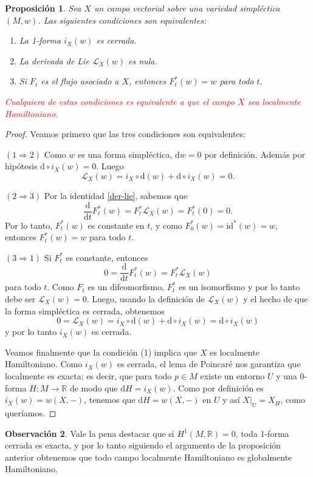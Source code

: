 \documentclass[11pt, a4paper]{article}
\newcommand{\RR}{\mathbb{R}}
\newcommand{\id}{\mathrm{id}}
\newcommand{\LL}{\mathcal{L}}
\newcommand{\dd}{\mathrm{d}}
\newcommand{\ddt}{\frac{\dd}{\dd t}}
\theoremstyle{plain}
\newtheorem{prop}{Proposición}[section]
\theoremstyle{definition}
\newtheorem{obs}[prop]{Observación}
\begin{document}
\begin{prop} Sea $X$ un campo vectorial sobre una variedad simpléctica $(M,w)$. Las siguientes condiciones son equivalentes:
\begin{enumerate}
\item La 1-forma $i_X(w)$ es cerrada.
\item La derivada de Lie $\LL_X(w)$ es nula.
\item Si $F_t$ es el flujo asociado a $X$, entonces $F_t^*(w)=w$ para todo $t$.
\end{enumerate}
\textcolor{red}{Cualquiera de estas condiciones es equivalente a que el campo $X$ sea localmente Hamiltoniano.}
\end{prop}
\begin{proof} Veamos primero que las tres condiciones son equivalentes:

$(1\Rightarrow 2)$ Como $w$ es una forma simpléctica, $\dd w=0$ por definición. Además por hipótesis $\dd \circ i_X(w)=0$. Luego
\[\LL_X(w)=i_X\circ\dd (w)+\dd \circ i_X(w)=0.\]

$(2\Rightarrow 3)$ Por la identidad \eqref{der-lie}, sabemos que
\[\ddt F_t^*(w) = F_t^*\LL_X(w)=F_t^*(0)=0.\]
Por lo tanto, $F_t^*(w)$ es constante en $t$, y como $F_0^*(w)=\id^*(w)=w$, entonces $F_t^*(w)=w$ para todo $t$.

$(3\Rightarrow 1)$ Si $F_t^*$ es constante, entonces
\[0=\ddt F_t^*(w) = F_t^*\LL_X(w)\]
para todo $t$. Como $F_t$ es un difeomorfismo, $F_t^*$ es un isomorfismo y por lo tanto debe ser $\LL_X(w)=0$. Luego, usando la definición de $\LL_X(w)$ y el hecho de que la forma simpléctica es cerrada, obtenemos
\[0=\LL_X(w)=i_X\circ\dd (w)+\dd \circ i_X(w) =\dd \circ i_X(w)\]
y por lo tanto $i_X(w)$ es cerrada.

Veamos finalmente que la condición (1) implica que $X$ es localmente Hamiltoniano. Como $i_X(w)$ es cerrada, el lema de Poincaré nos garantiza que localmente es exacta; es decir, que para todo $p\in M$ existe un entorno $U$ y una $0$-forma $H:M\to \RR$ de modo que $\dd H=i_X(w)$. Como por definición es $i_X(w)=w(X,-)$, tenemos que $\dd H=w(X,-)$ en $U$ y así $X|_U=X_H$, como queríamos.
\end{proof}

\begin{obs} Vale la pena destacar que si $H^1(M,\RR)=0$, toda 1-forma cerrada es exacta, y por lo tanto siguiendo el argumento de la proposición anterior obtenemos que todo campo localmente Hamiltoniano es globalmente Hamiltoniano.
\end{obs}
\end{document}
